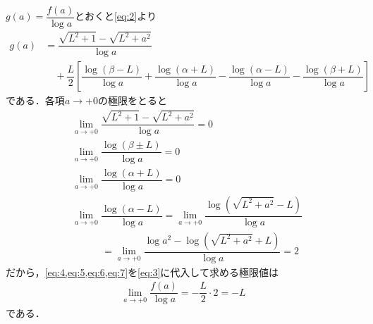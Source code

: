 \documentclass[../../main.tex]{subfiles}
\begin{document}
$g(a)=\dfrac{f(a)}{\log a}$とおくと\cref{eq:2}より
\begin{align}
  g(a)
  & = \dfrac{\sqrt{L^2+1} - \sqrt{L^2+a^2}}{\log a} \\
  & \quad + \dfrac{L}{2}\left[\dfrac{\log(\beta-L)}{\log a}+\dfrac{\log(\alpha+L)}{\log a} - \dfrac{\log(\alpha - L) }{\log a} - \dfrac{\log(\beta + L)}{\log a}\right] \label{eq:3}
\end{align}
である．各項$a\to +0$の極限をとると
\begin{align}
  & \lim_{a\to +0} \dfrac{\sqrt{L^2+1} - \sqrt{L^2+a^2}}{\log a} = 0 \label{eq:4} \\
  & \lim_{a\to +0} \dfrac{\log (\beta \pm L)}{\log a} = 0 \label{eq:5} \\
  & \lim_{a\to +0} \dfrac{\log (\alpha + L)}{\log a} =  0 \label{eq:6}\\
  & \lim_{a\to +0} \dfrac{\log (\alpha - L)}{\log a} = \lim_{a\to +0} \dfrac{\log (\sqrt{L^2+a^2} - L)}{\log a} \\
  & \quad \quad \quad = \lim_{a\to +0} \dfrac{\log a^2 - \log (\sqrt{L^2+a^2} + L)}{\log a} = 2 \label{eq:7}
\end{align}
だから，\cref{eq:4,eq:5,eq:6,eq:7}を\cref{eq:3}に代入して求める極限値は
\begin{align}
  \lim_{a\to +0}  \dfrac{f(a)}{\log a} = - \dfrac{L}{2} \cdot 2 = -L
\end{align}
である．
\end{document}
